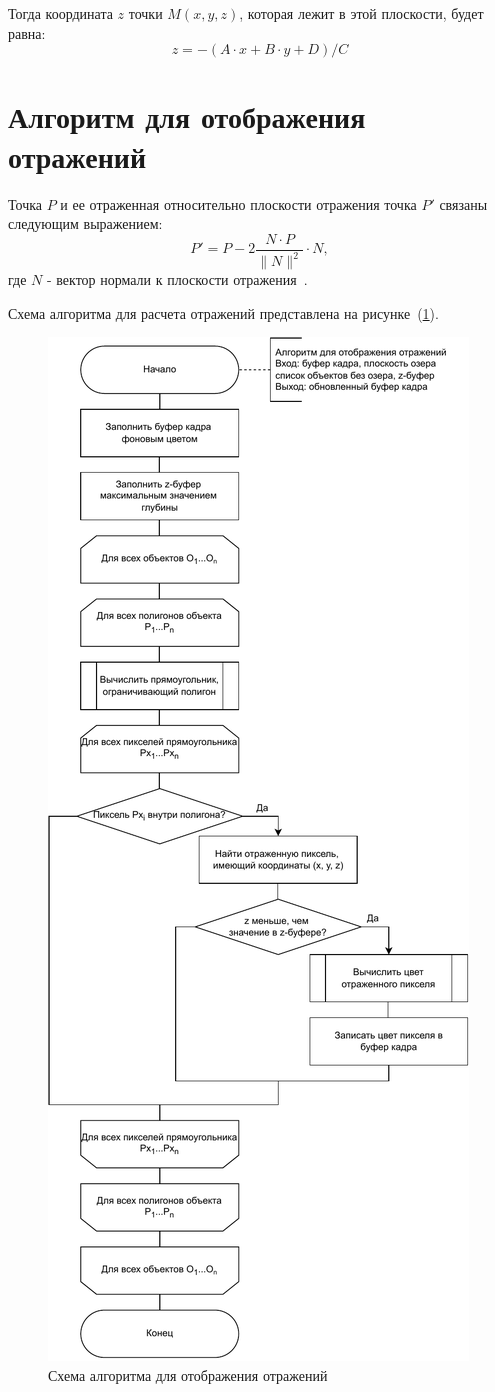 Тогда координата $z$ точки $M(x, y, z)$, которая лежит в этой плоскости, будет равна:
\begin{equation}
	\label{for:z}
	z = -(A \cdot x + B \cdot y + D) / C
\end{equation}

\section{Алгоритм для отображения отражений}

Точка $P$ и ее отраженная относительно плоскости отражения точка $P'$ связаны следующим выражением: 
\begin{equation}
	\label{for:ref}
	P' = P - 2\frac{N \cdot P}{\|N\|^2} \cdot N,
\end{equation}
где $N$ - вектор нормали к плоскости отражения~\cite{refl}.

Схема алгоритма для расчета отражений представлена на рисунке~(\ref{fig:reflect}).

\begin{figure}[h!]
	\centering
	\includegraphics[width=0.62\linewidth]{img/reflect}
	\caption{Схема алгоритма для отображения отражений}
	\label{fig:reflect}
\end{figure}
\clearpage

